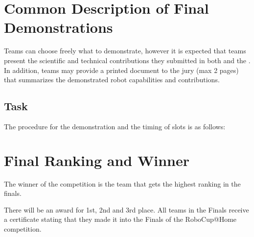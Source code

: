 \section{Common Description of Final Demonstrations}
Teams can choose freely what to demonstrate, however it is expected that teams present the scientific and technical contributions they submitted in both  and the .
In addition, teams may provide a printed document to the jury (max 2 pages) that summarizes the demonstrated robot capabilities and contributions.  

\subsection{Task}
The procedure for the demonstration and the timing of slots is as follows:

\OpenDemonstrationChanges

\section{Final Ranking and Winner}

The winner of the competition is the team that gets the highest
ranking in the finals.

There will be an award for 1st, 2nd and 3rd place. All teams in the
Finals receive a certificate stating that they made it into the Finals
of the RoboCup@Home competition.


